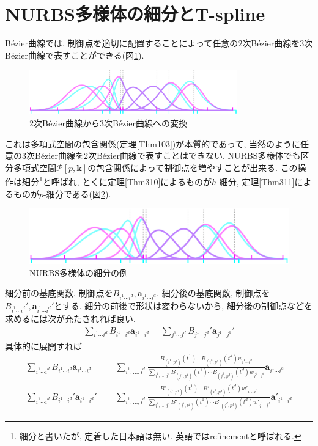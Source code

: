 \documentclass{jsarticle}
\theoremstyle{definition}%
\begin{document}
\section{NURBS多様体の細分とT-spline}
B\'{e}zier曲線では, 制御点を適切に配置することによって任意の$2$次B\'{e}zier曲線を$3$次B\'{e}zier曲線で表すことができる(図\ref{Fig601}).
\begin{figure}[H]
	\centering
    \includegraphics[page=3,clip,width=90mm]{figA.pdf}
    \caption{2次B\'{e}zier曲線から$3$次B\'{e}zier曲線への変換}
	\label{Fig601}
\end{figure}
これは多項式空間の包含関係(定理\ref{Thm103})が本質的であって, 当然のように任意の$3$次B\'{e}zier曲線を$2$次B\'{e}zier曲線で表すことはできない.
NURBS多様体でも区分多項式空間$\mathcal{P}[p,\bm{k}]$の包含関係によって制御点を増やすことが出来る.
この操作は細分\footnote{細分と書いたが, 定着した日本語は無い. 英語ではrefinementと呼ばれる.}と呼ばれ, とくに定理\ref{Thm310}によるものが$h$-細分, 定理\ref{Thm311}によるものが$p$-細分である(図\ref{Fig602}).
\begin{figure}[H]
	\centering
    \includegraphics[page=11,clip,width=150mm]{figA.pdf}
    \caption{NURBS多様体の細分の例}
	\label{Fig602}
\end{figure}
細分前の基底関数, 制御点を$B_{i^1\cdots i^d}, \bm{a}_{i^1\cdots i^d}$, 細分後の基底関数, 制御点を$B_{i^1\cdots i^d}', \bm{a}_{i^1\cdots i^d}'$とする.
細分の前後で形状は変わらないから, 細分後の制御点などを求めるには次が充たされれば良い.
\begin{align}
    \sum_{i^1\cdots i^d} B_{i^1\cdots i^d}\bm{a}_{i^1\cdots i^d}
    =\sum_{j^1\cdots j^d} B_{j^1\cdots j^d}'\bm{a}_{j^1\cdots j^d}'
\end{align}
具体的に展開すれば
\begin{align}
    \sum_{i^1\cdots i^d} B_{i^1\cdots i^d}\bm{a}_{i^1\cdots i^d}
    &=\sum_{i^1,\dots,i^d} \frac{B_{(i^1,p^1)}(t^1)\cdots B_{(i^d,p^d)}(t^d)w_{i^1\cdots i^d}}{\sum\limits_{j^1,\dots,j^d}B_{(j^1,p^1)}(t^1)\cdots B_{(j^d,p^d)}(t^d)w_{j^1\cdots j^d}}\bm{a}_{i^1\cdots i^d} \\
    \sum_{i^1\cdots i^d} B_{i^1\cdots i^d}'\bm{a}_{i^1\cdots i^d}'
    &=\sum_{i^1,\dots,i^d} \frac{B'_{(i^1,p^1)}(t^1)\cdots B'_{(i^d,p^d)}(t^d)w'_{i^1\cdots i^d}}{\sum\limits_{j^1,\dots,j^d}B'_{(j^1,p^1)}(t^1)\cdots B'_{(j^d,p^d)}(t^d)w'_{j^1\cdots j^d}}\bm{a}'_{i^1\cdots i^d}
\end{align}
\end{document}
